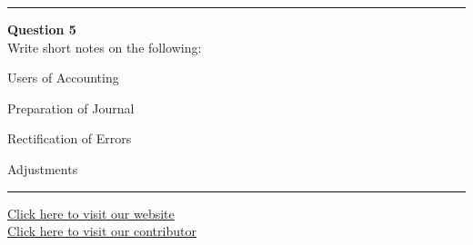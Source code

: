 \documentclass[11pt,a4paper]{article}
\begin{document}
\medskip\rule{\linewidth}{0.2pt}\medskip




\noindent   \textbf{Question 5} \\
Write short notes on the following:

\begin{parts}
  \item Users of Accounting
  \item Preparation of Journal
  \item Rectification of Errors
  \item Adjustments
\end{parts}

\vfill\rule{\linewidth}{0.4pt}

\begin{center}\small
\href{https://bhu-exam.vercel.app/}{Click here to visit our website}\\[4pt]
\href{https://me-aryan.vercel.app/}{Click here to visit our contributor}
\end{center}
\end{document}
